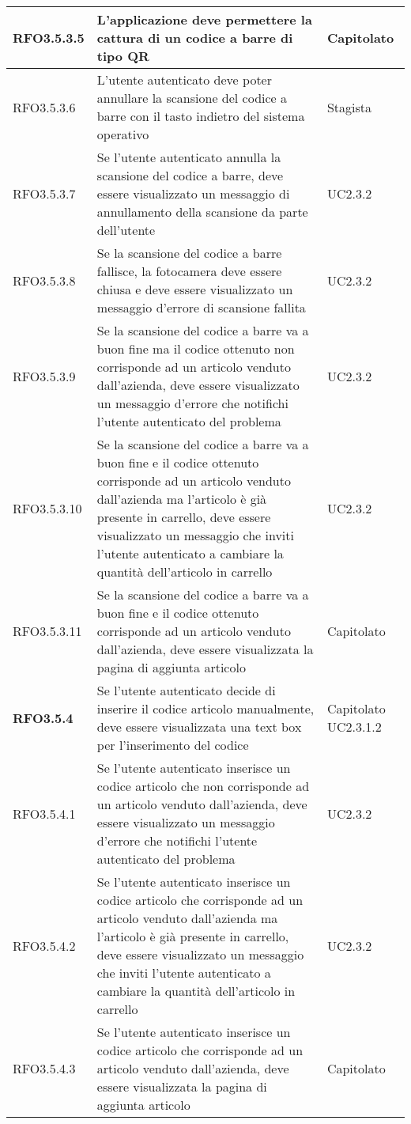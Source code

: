 {\begin{center}
\begin{longtable}{ | >{\centering\arraybackslash}p{2.5cm} | >{\arraybackslash}p{7cm} | >{\centering\arraybackslash}p{2cm} | }
RFO3.5.3.5 & L'applicazione deve permettere la cattura di un codice a barre di tipo QR & Capitolato \\ \hline
RFO3.5.3.6 & L'utente autenticato deve poter annullare la scansione del codice a barre con il tasto indietro del sistema operativo & Stagista \\ \hline
RFO3.5.3.7 & Se l'utente autenticato annulla la scansione del codice a barre, deve essere visualizzato un messaggio di annullamento della scansione da parte dell'utente & UC2.3.2 \\ \hline
RFO3.5.3.8 & Se la scansione del codice a barre fallisce, la fotocamera deve essere chiusa e deve essere visualizzato un messaggio d'errore di scansione fallita & UC2.3.2 \\ \hline
RFO3.5.3.9 & Se la scansione del codice a barre va a buon fine ma il codice ottenuto non corrisponde ad un articolo venduto dall'azienda, deve essere visualizzato un messaggio d'errore che notifichi l'utente autenticato del problema & UC2.3.2 \\ \hline
RFO3.5.3.10 & Se la scansione del codice a barre va a buon fine e il codice ottenuto corrisponde ad un articolo venduto dall'azienda ma l'articolo è già presente in carrello, deve essere visualizzato un messaggio che inviti l'utente autenticato a cambiare la quantità dell'articolo in carrello & UC2.3.2 \\ \hline
RFO3.5.3.11 & Se la scansione del codice a barre va a buon fine e il codice ottenuto corrisponde ad un articolo venduto dall'azienda, deve essere visualizzata la pagina di aggiunta articolo & Capitolato \\ \hline
\textbf{RFO3.5.4} & Se l'utente autenticato decide di inserire il codice articolo manualmente, deve essere visualizzata una text box per l'inserimento del codice & Capitolato UC2.3.1.2 \\ \hline
RFO3.5.4.1 & Se l'utente autenticato inserisce un codice articolo che non corrisponde ad un articolo venduto dall'azienda, deve essere visualizzato un messaggio d'errore che notifichi l'utente autenticato del problema & UC2.3.2 \\ \hline
RFO3.5.4.2 & Se l'utente autenticato inserisce un codice articolo che corrisponde ad un articolo venduto dall'azienda ma l'articolo è già presente in carrello, deve essere visualizzato un messaggio che inviti l'utente autenticato a cambiare la quantità dell'articolo in carrello & UC2.3.2 \\ \hline
RFO3.5.4.3 & Se l'utente autenticato inserisce un codice articolo che corrisponde ad un articolo venduto dall'azienda, deve essere visualizzata la pagina di aggiunta articolo & Capitolato \\ \hline

\end{longtable}
\end{center}}
